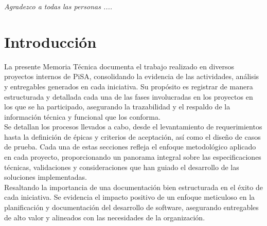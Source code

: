 \documentclass[12pt,letterpaper,spanish, xcolor=table]{report}
\numberwithin{figure}{subsection}
\newenvironment{dedication}{\newpage\large\null\em\vskip1in}%
{\vfill}
\begin{document}
		\begin{dedication}
			Agradezco a todas las personas ....
		\end{dedication}




\tableofcontents




\oddsidemargin 0.2in \textwidth 6.5in \topmargin -0.25in
\textheight 9in \pagestyle{myheadings}
	
	
\newpage



\chapter{Introducción}
\newpage

La presente Memoria Técnica documenta el trabajo realizado en diversos proyectos internos de PiSA, consolidando la evidencia de las actividades, análisis y entregables generados en cada iniciativa. Su propósito es registrar de manera estructurada y detallada cada una de las fases involucradas en los proyectos en los que se ha participado, asegurando la trazabilidad y el respaldo de la información técnica y funcional que los conforma.\\

Se detallan los procesos llevados a cabo, desde el levantamiento de requerimientos hasta la definición de épicas y criterios de aceptación, así como el diseño de casos de prueba. Cada una de estas secciones refleja el enfoque metodológico aplicado en cada proyecto, proporcionando un panorama integral sobre las especificaciones técnicas, validaciones y consideraciones que han guiado el desarrollo de las soluciones implementadas.\\

Resaltando la importancia de una documentación bien estructurada en el éxito de cada iniciativa. Se evidencia el impacto positivo de un enfoque meticuloso en la planificación y documentación del desarrollo de software, asegurando entregables de alto valor y alineados con las necesidades de la organización.\\
\end{document}
